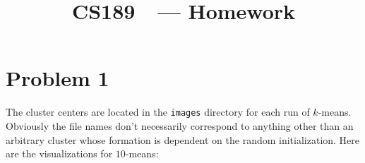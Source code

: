 \documentclass[11pt]{article}
\title{CS189\ \Session\  --- Homework \Homework}
\author{\Name}
\begin{document}
\maketitle
{}
\setcounter{problemnumber}{0}

\section*{Problem 1}
The cluster centers are located in the \texttt{images} directory for each run of $k$-means. Obviously the file names don't necessarily correspond to anything other than an arbitrary cluster whose formation is dependent on the random initialization. Here are the visualizations for $10$-means:\\
\end{document}
